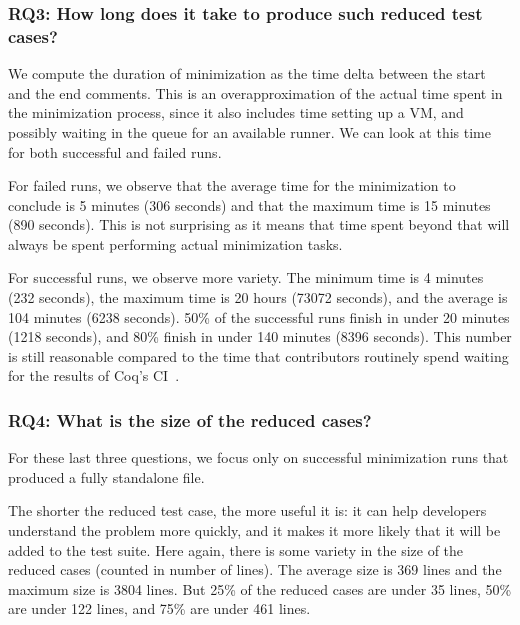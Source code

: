 \documentclass[a4paper,USenglish,cleveref,autoref,thm-restate]{lipics-v2021}
\begin{document}
\subsubsection{RQ3: How long does it take to produce such reduced test cases?}

We compute the duration of minimization as the time delta between the start and the end comments.
This is an overapproximation of the actual time spent in the minimization process, since it also includes time setting up a VM, and possibly waiting in the queue for an available runner.
%
We can look at this time for both successful and failed runs.

For failed runs, we observe that the average time for the minimization to conclude is 5 minutes (306 seconds) and that the maximum time is 15 minutes (890 seconds). This is not surprising as it means that time spent beyond that will always be spent performing actual minimization tasks.

For successful runs, we observe more variety. The minimum time is 4 minutes (232 seconds), the maximum time is 20 hours (73072 seconds), and the average is 104 minutes (6238 seconds). 50\% of the successful runs finish in under 20 minutes (1218 seconds), and 80\% finish in under 140 minutes (8396 seconds). This number is still reasonable compared to the time that contributors routinely spend waiting for the results of Coq's CI~\cite{zimmermann:tel-02451322}.

\subsubsection{RQ4: What is the size of the reduced cases?}

For these last three questions, we focus only on successful minimization runs that produced a fully standalone file.

The shorter the reduced test case, the more useful it is: it can help developers understand the problem more quickly, and it makes it more likely that it will be added to the test suite. Here again, there is some variety in the size of the reduced cases (counted in number of lines). The average size is 369 lines and the maximum size is 3804 lines. But 25\% of the reduced cases are under 35 lines, 50\% are under 122 lines, and 75\% are under 461 lines.
\end{document}
